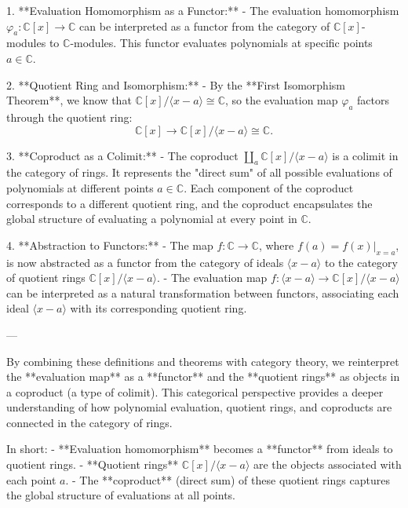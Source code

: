 \documentclass[11pt,openany]{article}
\begin{document}
1. **Evaluation Homomorphism as a Functor:**
- The evaluation homomorphism \( \varphi_a: \mathbb{C}[x] \to \mathbb{C} \) can be interpreted as a functor from the category of \( \mathbb{C}[x] \)-modules to \( \mathbb{C} \)-modules. This functor evaluates polynomials at specific points \( a \in \mathbb{C} \).

2. **Quotient Ring and Isomorphism:**
- By the **First Isomorphism Theorem**, we know that \( \mathbb{C}[x] / \langle x - a \rangle \cong \mathbb{C} \), so the evaluation map \( \varphi_a \) factors through the quotient ring:
\[
\mathbb{C}[x] \to \mathbb{C}[x] / \langle x - a \rangle \cong \mathbb{C}.
\]

3. **Coproduct as a Colimit:**
- The coproduct \( \coprod_a \mathbb{C}[x] / \langle x - a \rangle \) is a colimit in the category of rings. It represents the "direct sum" of all possible evaluations of polynomials at different points \( a \in \mathbb{C} \). Each component of the coproduct corresponds to a different quotient ring, and the coproduct encapsulates the global structure of evaluating a polynomial at every point in \( \mathbb{C} \).

4. **Abstraction to Functors:**
- The map \( f: \mathbb{C} \to \mathbb{C} \), where \( f(a) = f(x) \big|_{x=a} \), is now abstracted as a functor from the category of ideals \( \langle x - a \rangle \) to the category of quotient rings \( \mathbb{C}[x] / \langle x - a \rangle \).
- The evaluation map \( f: \langle x - a \rangle \to \mathbb{C}[x] / \langle x - a \rangle \) can be interpreted as a natural transformation between functors, associating each ideal \( \langle x - a \rangle \) with its corresponding quotient ring.

---


By combining these definitions and theorems with category theory, we reinterpret the **evaluation map** as a **functor** and the **quotient rings** as objects in a coproduct (a type of colimit). This categorical perspective provides a deeper understanding of how polynomial evaluation, quotient rings, and coproducts are connected in the category of rings.

In short:
- **Evaluation homomorphism** becomes a **functor** from ideals to quotient rings.
- **Quotient rings** \( \mathbb{C}[x] / \langle x - a \rangle \) are the objects associated with each point \( a \).
- The **coproduct** (direct sum) of these quotient rings captures the global structure of evaluations at all points.
\end{document}
